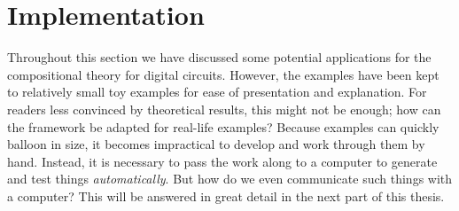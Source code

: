 \section{Implementation}

Throughout this section we have discussed some potential applications for the
compositional theory for digital circuits.
However, the examples have been kept to relatively small toy examples for
ease of presentation and explanation.
For readers less convinced by theoretical results, this might not be enough; how
can the framework be adapted for real-life examples?
Because examples can quickly balloon in size, it becomes impractical to develop
and work through them by hand.
Instead, it is necessary to pass the work along to a computer to generate and
test things \emph{automatically}.
But how do we even communicate such things with a computer?
This will be answered in great detail in the next part of this thesis.

